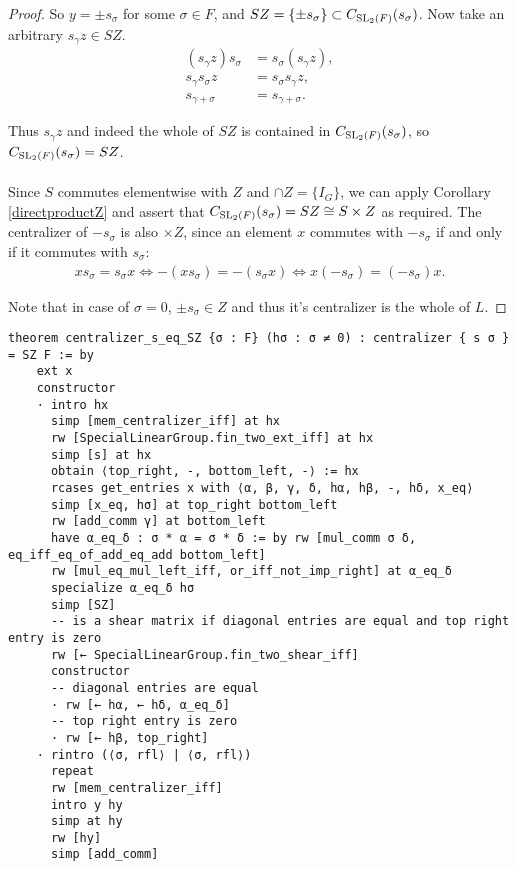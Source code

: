 \begin{proof}
So $y = \pm s_\sigma$ for some $\sigma \in F$, and $SZ = \{ \pm s_\sigma \} \subset C_{\operatorname{SL}_2(F)}(s_\sigma)$. Now take an arbitrary $s_\gamma z \in SZ$.
\begin{align*} (s_\gamma z) s_\sigma &= s_\sigma (s_\gamma z),
\\ s_\gamma s_\sigma z &= s_\sigma s_\gamma z, \tag{since $z \in Z$}
\\ s_{\gamma + \sigma} &= s_{\gamma + \sigma}.
\end{align*}

Thus $s_\gamma z$ and indeed the whole of $SZ$ is contained in $ C_{\operatorname{SL}_2(F)}(s_\sigma)$, so $C_{\operatorname{SL}_2(F)}(s_\sigma) = SZ$. \\
\\
Since $S$ commutes elementwise with $Z$ and $\cap Z = \{ I_G \}$, we can apply Corollary \ref{directproductZ} and assert that $C_{\operatorname{SL}_2(F)}(s_\sigma) = SZ \cong S \times Z$ as required. The centralizer of $- s_\sigma$ is also $\times Z$, since an element $x$ commutes with $- s_\sigma$ if and only if it commutes with $s_\sigma$:
\begin{align*} 
    xs_\sigma = s_\sigma x \iff -(x s_\sigma) = - (s_\sigma x) \iff x(- s_\sigma) = (- s_\sigma)x.
\end{align*}

Note that in case of $\sigma = 0$, $\pm s_\sigma \in Z$ and thus it's centralizer is the whole of $L$.

\end{proof}
\begin{footnotesize}
\begin{verbatim}
theorem centralizer_s_eq_SZ {σ : F} (hσ : σ ≠ 0) : centralizer { s σ } = SZ F := by
    ext x
    constructor
    · intro hx
      simp [mem_centralizer_iff] at hx
      rw [SpecialLinearGroup.fin_two_ext_iff] at hx
      simp [s] at hx
      obtain ⟨top_right, -, bottom_left, -⟩ := hx
      rcases get_entries x with ⟨α, β, γ, δ, hα, hβ, -, hδ, x_eq⟩
      simp [x_eq, hσ] at top_right bottom_left
      rw [add_comm γ] at bottom_left
      have α_eq_δ : σ * α = σ * δ := by rw [mul_comm σ δ, eq_iff_eq_of_add_eq_add bottom_left]
      rw [mul_eq_mul_left_iff, or_iff_not_imp_right] at α_eq_δ
      specialize α_eq_δ hσ
      simp [SZ]
      -- is a shear matrix if diagonal entries are equal and top right entry is zero
      rw [← SpecialLinearGroup.fin_two_shear_iff]
      constructor
      -- diagonal entries are equal
      · rw [← hα, ← hδ, α_eq_δ]
      -- top right entry is zero
      · rw [← hβ, top_right]
    · rintro (⟨σ, rfl⟩ | ⟨σ, rfl⟩)
      repeat
      rw [mem_centralizer_iff]
      intro y hy
      simp at hy
      rw [hy]
      simp [add_comm]
\end{verbatim}
\end{footnotesize}

